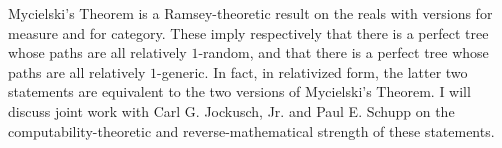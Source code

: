 \documentclass[bsl,meeting]{asl}
\newcommand{\NP}{}
\begin{document}
\thispagestyle{empty}

\NP  
{}

Mycielski's Theorem is a Ramsey-theoretic result on the reals with
versions for measure and for category. These imply respectively that
there is a perfect tree whose paths are all relatively $1$-random, and
that there is a perfect tree whose paths are all relatively
$1$-generic. In fact, in relativized form, the latter two statements
are equivalent to the two versions of Mycielski's Theorem. I will
discuss joint work with Carl G. Jockusch, Jr. and Paul E. Schupp on
the computability-theoretic and reverse-mathematical strength of these
statements.
\end{document}
